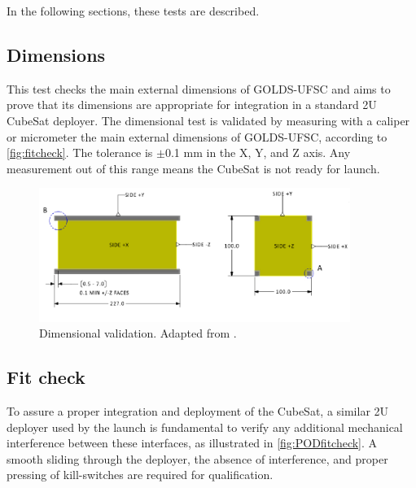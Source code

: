 In the following sections, these tests are described.


\subsection{Dimensions}

This test checks the main external dimensions of GOLDS-UFSC and aims to prove that its dimensions are appropriate for integration in a standard 2U CubeSat deployer. The dimensional test is validated by measuring with a caliper or micrometer the main external dimensions of GOLDS-UFSC, according to \autoref{fig:fitcheck}. The tolerance is $\pm$0.1 mm in the X, Y, and Z axis. Any measurement out of this range means the CubeSat is not ready for launch.

\begin{figure}[!htb]
    \begin{center}
        \includegraphics[width=0.9\textwidth]{figures/fit_check.png}
        \caption{Dimensional validation. Adapted from \cite{cds}.}
        \label{fig:fitcheck}
    \end{center}
\end{figure}

\subsection{Fit check}

To assure a proper integration and deployment of the CubeSat, a similar 2U deployer used by the launch is fundamental to verify any additional mechanical interference between these interfaces, as illustrated in \autoref{fig:PODfitcheck}. A smooth sliding through the deployer, the absence of interference, and proper pressing of kill-switches are required for qualification.



